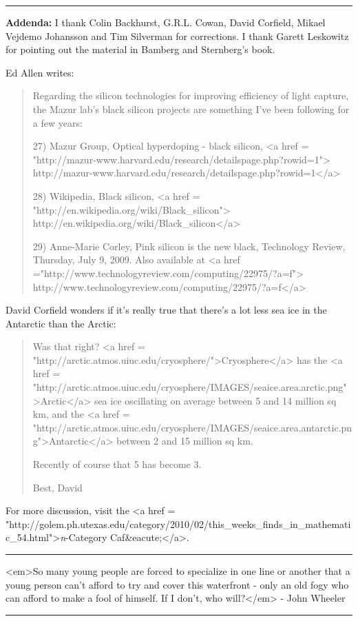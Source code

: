 \par\noindent\rule{\textwidth}{0.4pt}

\textbf{Addenda:} I thank Colin Backhurst, G.R.L. Cowan, David Corfield, Mikael
Vejdemo Johansson and Tim Silverman for corrections.  I thank Garett
Leskowitz for pointing out the material in Bamberg and Sternberg's
book.

Ed Allen writes:

\begin{quote}
Regarding the silicon technologies for improving efficiency of light capture, 
the Mazur lab's black silicon projects are something I've been following for a 
few years:

27) Mazur Group, Optical hyperdoping - black silicon, 
<a href = "http://mazur-www.harvard.edu/research/detailspage.php?rowid=1">
http://mazur-www.harvard.edu/research/detailspage.php?rowid=1</a>

28) Wikipedia, Black silicon, <a href =
"http://en.wikipedia.org/wiki/Black_silicon">
http://en.wikipedia.org/wiki/Black_silicon</a>

29) Anne-Marie Corley, Pink silicon is the new black, Technology
Review, Thursday, July 9, 2009.  Also available at <a href
="http://www.technologyreview.com/computing/22975/?a=f">
http://www.technologyreview.com/computing/22975/?a=f</a>

\end{quote}


David Corfield wonders if it's really true that there's a
lot less sea ice in the Antarctic than the Arctic:

\begin{quote}

Was that right? <a href = "http://arctic.atmos.uiuc.edu/cryosphere/">Cryosphere</a> has the 
<a href = 
"http://arctic.atmos.uiuc.edu/cryosphere/IMAGES/seaice.area.arctic.png">Arctic</a> sea ice oscillating on average between 5 and 14 million sq km, and the
<a href = "http://arctic.atmos.uiuc.edu/cryosphere/IMAGES/seaice.area.antarctic.png">Antarctic</a> between 2 and 15 million sq km.


Recently of course that 5 has become 3.

Best, David

\end{quote}




For more discussion, visit the
<a href = "http://golem.ph.utexas.edu/category/2010/02/this_weeks_finds_in_mathematic_54.html">\emph{n}-Category Caf&eacute;</a>.

\par\noindent\rule{\textwidth}{0.4pt}
<em>So many young people are forced to specialize in one line or another that 
a young person can't afford to try and cover this waterfront - only an old 
fogy who can afford to make a fool of himself.  If I don't, who will?</em> -
John Wheeler

\par\noindent\rule{\textwidth}{0.4pt}

